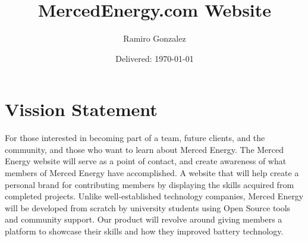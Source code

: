 \documentclass[12pt]{article}
\begin{document}
\title{MercedEnergy.com Website}
\author{Ramiro Gonzalez}
\date{Delivered: \today}

\maketitle
\section*{Vission Statement}
\Large For those interested in becoming part of a team, future clients, and the community, and those who want to learn about Merced Energy. The Merced Energy website will serve as a point of contact, and create awareness of what members of Merced Energy have accomplished. A website that will help create a personal brand for contributing members by displaying the skills acquired from completed projects. Unlike well-established technology companies, Merced Energy will be developed from scratch by university students using Open Source tools and community support. Our product will revolve around giving members a platform to showcase their skills and how they improved battery technology. 
\end{document}
